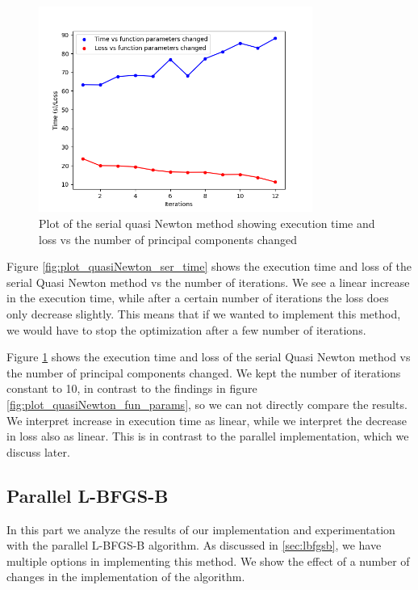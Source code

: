\begin{figure}[H]
    \centering
    \includegraphics[width = 0.8\textwidth]{figures/plot_quasiNewton_ser_fun_params.png}
    \caption[Serial quasi Newton: time and loss vs principal components]{Plot of the serial quasi Newton method showing execution time and loss vs the number of principal components changed}
    \label{fig:plot_quasiNewton_ser_fun_params}
\end{figure}

Figure \ref{fig:plot_quasiNewton_ser_time} shows the execution time and loss of the serial Quasi Newton method vs the number of iterations. We see a linear increase in the execution time, while after a certain
number of iterations the loss does only decrease slightly. This means that if we wanted to implement this method, we would have to stop the optimization after a few number of iterations.

Figure \ref{fig:plot_quasiNewton_ser_fun_params} shows the execution time and loss of the serial Quasi Newton method vs the number of principal components changed. We kept the number of iterations constant to 10, in contrast to
the findings in figure \ref{fig:plot_quasiNewton_fun_params}, so we can not directly compare the results. We interpret increase in execution time as linear, while we interpret the decrease in loss also as linear. This is in contrast
to the parallel implementation, which we discuss later.

\subsection{Parallel L-BFGS-B}

In this part we analyze the results of our implementation and experimentation with the parallel L-BFGS-B algorithm. As discussed in \ref{sec:lbfgsb},
we have multiple options in implementing this method. We show the effect of a number of changes in the implementation of the algorithm.


